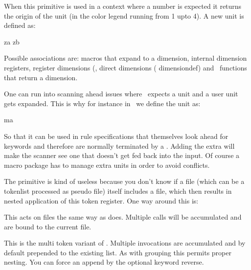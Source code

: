 When this primitive is used in a context where a number is expected it returns the origin
of the unit (in the color legend running from 1 upto 4). A new unit is defined as:

\starttyping
\newdimen\MyDimenZA  \MyDimenZA=10pt

\protected\def\MyDimenAB{\dimexpr\hsize/2\relax}

\associateunit za \MyDimenZA
\associateunit zb \MyMacroZB
\stoptyping

Possible associations are: macros that expand to a dimension, internal dimension
registers, register dimensions (, direct dimensions (\prm
{dimensiondef}) and \LUA\ functions that return a dimension.

One can run into scanning ahead issues where \TEX\ expects a unit and a user unit
gets expanded. This is why for instance in \CONTEXT\ we define the  unit
as:

\starttyping
\protected\def\mathaxisunit{\scaledmathaxis\mathstyle\norelax}

\associateunit ma \mathaxisunit %
\stoptyping

So that it can be used in rule specifications that themselves look ahead for
keywords and therefore are normally terminated by a . Adding the
extra  will make the scanner see one that doesn't get fed back into
the input. Of course a macro package has to manage extra units in order to avoid
conflicts.

\stopnewprimitive

\startnewprimitive[title={\prm {atendoffile}}]

The  primitive is kind of useless because you don't know if a file
(which can be a tokenlist processed as pseudo file) itself includes a file, which
then results in nested application of this token register. One way around this is:

\startbuffer
\atendoffile\SomeCommand
\stopbuffer

\typebuffer

This acts on files the same way as  does. Multiple calls will
be accumulated and are bound to the current file.

\stopnewprimitive

\startnewprimitive[title={\prm {atendoffiled}}]

This is the multi token variant of . Multiple invocations are
accumulated and by default prepended to the existing list. As with grouping this
permits proper nesting. You can force an append by the optional keyword {reverse}.

